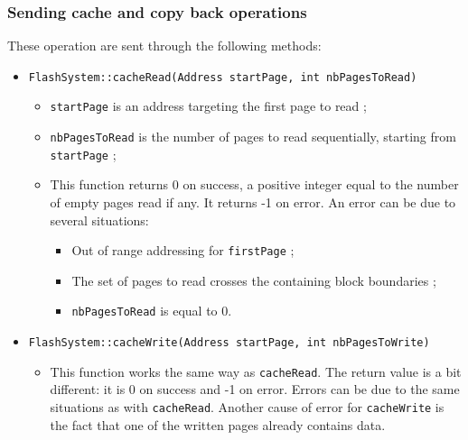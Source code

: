 \subsubsection{Sending cache and copy back operations}

These operation are sent through the following methods:

\begin{itemize}
  \item \verb+FlashSystem::cacheRead(Address startPage, int nbPagesToRead)+
  \begin{itemize}
    \item \verb+startPage+ is an address targeting the first page to read ;
    \item \verb+nbPagesToRead+ is the number of pages to read sequentially, starting from \verb+startPage+ ;
    \item This function returns 0 on success, a positive integer equal to the number of empty pages read if any. It returns -1 on error. An error can be due to several situations:
    \begin{itemize}
      \item Out of range addressing for \verb+firstPage+ ;
      \item The set of pages to read crosses the containing block boundaries ;
      \item \verb+nbPagesToRead+ is equal to 0.
    \end{itemize}
  \end{itemize}
  
  \item \verb+FlashSystem::cacheWrite(Address startPage, int nbPagesToWrite)+
  \begin{itemize}
    \item This function works the same way as \verb+cacheRead+. The return value is a bit different: it is 0 on success and -1 on error. Errors can be due to the same situations as with \verb+cacheRead+. Another cause of error for \verb+cacheWrite+ is the fact that one of the written pages already contains data.
  \end{itemize}
  

\end{itemize}

